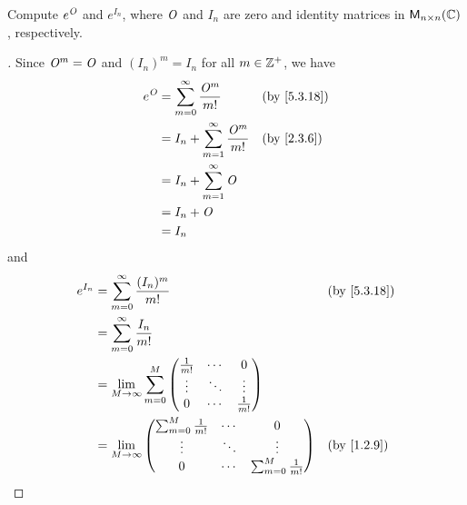 \begin{ex}\label{ex:5.3.20}
	Compute \(e^{\mathit{O}}\) and \(e^{I_n}\), where \(\mathit{O}\) and \(I_n\) are zero and identity matrices in \(\ms[n][n][\C]\), respectively.
\end{ex}

\begin{proof}[]
	Since \(\mathit{O}^m = \mathit{O}\) and \((I_n)^m = I_n\) for all \(m \in \mathbb{Z}^+\), we have
	\begin{align*}
		e^{\zm} & = \sum_{m = 0}^\infty \frac{\zm^m}{m!}       &  & \by{5.3.18} \\
		        & = I_n + \sum_{m = 1}^\infty \frac{\zm^m}{m!} &  & \by{2.3.6}  \\
		        & = I_n + \sum_{m = 1}^\infty \zm                               \\
		        & = I_n + \zm                                                   \\
		        & = I_n
	\end{align*}
	and
	\begin{align*}
		e^{I_n} & = \sum_{m = 0}^\infty \frac{(I_n)^m}{m!}                                                                      &  & \by{5.3.18} \\
		        & = \sum_{m = 0}^\infty \frac{I_n}{m!}                                                                                           \\
		        & = \lim_{M \to \infty} \sum_{m = 0}^M \begin{pmatrix}
			                                               \frac{1}{m!} & \cdots & 0            \\
			                                               \vdots       & \ddots & \vdots       \\
			                                               0            & \cdots & \frac{1}{m!}
		                                               \end{pmatrix}                                                      \\
		        & = \lim_{M \to \infty} \begin{pmatrix}
			                                \sum_{m = 0}^M  \frac{1}{m!} & \cdots & 0                           \\
			                                \vdots                       & \ddots & \vdots                      \\
			                                0                            & \cdots & \sum_{m = 0}^M \frac{1}{m!}
		                                \end{pmatrix}                                        &  & \by{1.2.9}                                     \\

\end{align*}
\end{proof}
